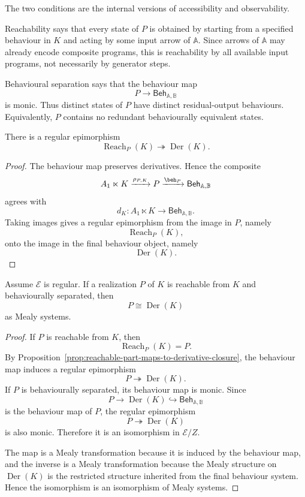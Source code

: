 \begin{remark}
\label{rem:reachable-separated-interpretation}
The two conditions are the internal versions of accessibility and
observability.

Reachability says that every state of \(P\) is obtained by starting from a
specified behaviour in \(K\) and acting by some input arrow of \(\mathbb A\).
Since arrows of \(\mathbb A\) may already encode composite programs, this is
reachability by all available input programs, not necessarily by generator
steps.

Behavioural separation says that the behaviour map
\[
P\to\mathsf{Beh}_{\mathbb A,\mathbb B}
\]
is monic. Thus distinct states of \(P\) have distinct residual-output
behaviours. Equivalently, \(P\) contains no redundant behaviourally equivalent
states.
\end{remark}

\begin{proposition}
\label{prop:reachable-part-maps-to-derivative-closure}
There is a regular epimorphism
\[
\operatorname{Reach}_P(K)
\twoheadrightarrow
\operatorname{Der}(K).
\]
\end{proposition}

\begin{proof}
The behaviour map preserves derivatives. Hence the composite
\[
A_1\ltimes K
\xrightarrow{\rho_{P,K}}
P
\xrightarrow{\beh_P}
\mathsf{Beh}_{\mathbb A,\mathbb B}
\]
agrees with
\[
d_K:
A_1\ltimes K
\to
\mathsf{Beh}_{\mathbb A,\mathbb B}.
\]
Taking images gives a regular epimorphism from the image in \(P\), namely
\[
\operatorname{Reach}_P(K),
\]
onto the image in the final behaviour object, namely
\[
\operatorname{Der}(K).
\]
\end{proof}

\begin{theorem}
\label{thm:minimal-realization}
Assume \(\mathcal E\) is regular. If a realization \(P\) of \(K\) is reachable
from \(K\) and behaviourally separated, then
\[
P\cong\operatorname{Der}(K)
\]
as Mealy systems.
\end{theorem}

\begin{proof}
If \(P\) is reachable from \(K\), then
\[
\operatorname{Reach}_P(K)=P.
\]
By Proposition~\ref{prop:reachable-part-maps-to-derivative-closure}, the
behaviour map induces a regular epimorphism
\[
P\twoheadrightarrow\operatorname{Der}(K).
\]
If \(P\) is behaviourally separated, its behaviour map is monic. Since
\[
P\to\operatorname{Der}(K)\hookrightarrow
\mathsf{Beh}_{\mathbb A,\mathbb B}
\]
is the behaviour map of \(P\), the regular epimorphism
\[
P\twoheadrightarrow\operatorname{Der}(K)
\]
is also monic. Therefore it is an isomorphism in \(\mathcal E/Z\).

The map is a Mealy transformation because it is induced by the behaviour map,
and the inverse is a Mealy transformation because the Mealy structure on
\(\operatorname{Der}(K)\) is the restricted structure inherited from the final
behaviour system. Hence the isomorphism is an isomorphism of Mealy systems.
\end{proof}

